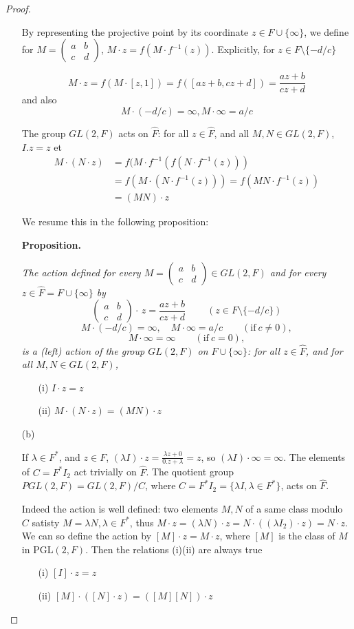 \documentclass[11pt,a4paper]{article}
\newcommand{\be} {\begin{enumerate}}
\newcommand{\ee} {\end{enumerate}}
\begin{document}
\begin{proof}
\begin{enumerate}
By representing the projective point by its coordinate $z \in F \cup \{\infty\}$, we define for 
$M =
\left(
\begin{array}{cc}
 a&   b   \\
 c&   d   
\end{array}
\right)
$, 
 $M\cdot z = f(M\cdot f^{-1}(z))$. Explicitly, for $z \in F\setminus\{-d/c\}$

$$M\cdot z = f\left(M\cdot [z,1]\right)
=f([az+b,cz+d])=\frac{az+b}{cz+d}
$$
and also
$$M\cdot (-d/c) = \infty, M\cdot \infty = a/c$$

The group $GL(2,F)$ acts on $\hat{F} $: for all $z\in \hat{F }$, and all $ M,N \in GL(2,F)$,
$I.z=z$ et 
\begin{align*}
M\cdot (N\cdot z) &= f(M \cdot f^{-1}(f(N\cdot f^{-1}(z)))\\
&=f(M\cdot (N\cdot f^{-1}(z)))=f(MN \cdot f^{-1}(z))\\
&=(MN) \cdot z
\end{align*}

We resume this in the following proposition:

{\bf Proposition.}
{\it The action defined for every $M =
\left(
\begin{array}{cc}
 a&   b   \\
 c&   d   
\end{array}
\right)
 \in GL(2,F)$ and for every $z \in \hat{F} = F \cup \{\infty\} $ by
$$\left(
\begin{array}{cc}
 a&   b   \\
 c&   d   
\end{array}
\right)\cdot \, z = \frac{az+b}{cz+d}\ \qquad(z\in F\setminus\{-d/c\})
$$
$$M \cdot (-d/c) = \infty,\quad M \cdot \infty = a/c \qquad (\mathrm{if} \ c\neq 0),$$
$$M \cdot \infty = \infty \qquad (\mathrm{if}\ c=0),$$
is a (left) action of the group $GL(2,F)$ on $F \cup \{\infty\}$:
for all  $z\in \hat{F }$, and for all  $ M,N\in GL(2,F)$,
\be
\item[(i)] $I \cdot z=z$
\item[(ii)] $M\cdot (N \cdot z) = (MN) \cdot z$
\ee
}
\item[(b)]

If $\lambda \in F^*$, and $z \in F$, $(\lambda I) \cdot z = \frac{\lambda z +0}{0.z + \lambda} = z$, so $(\lambda I) \cdot \infty = \infty$. The elements of $C = F^* I_2$ act trivially on  $\hat{F}$.
The quotient group $PGL(2,F) = GL(2,F)/C$, where $C =F^* I_2 =  \{\lambda I, \lambda \in F^*\}$, acts on $\hat{F}$.

Indeed the action is well defined: two elements $M,N$ of a same class modulo $C$ satisty $M = \lambda N, \lambda \in F^*$, thus $M\cdot z = (\lambda N)\cdot z =N \cdot ((\lambda I_2) \cdot z) =  N \cdot z$. We can so define the action by $[M] \cdot z = M \cdot z$, where $[M]$ is the class of $M$ in $\mathrm{PGL}(2,F)$. Then the relations (i)(ii) are always true

\be
\item[(i)] $[I] \cdot z=z$
\item[(ii)] $[M]\cdot ([N] \cdot z) = ([M][N]) \cdot z$
\ee

\end{enumerate}
\end{proof}
\end{document}
